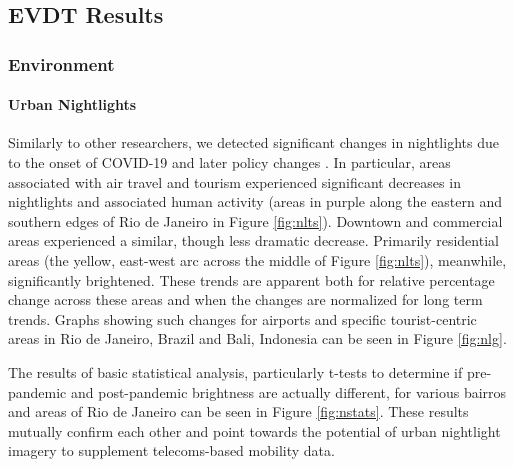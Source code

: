 \subsection{EVDT Results} \label{sec:vida-evdt-result}

\subsubsection{Environment} \label{sec:vida-evdt-e-result}

\paragraph{Urban Nightlights} \leavevmode\newline

Similarly to other researchers, we detected significant changes in nightlights due to the onset of COVID-19 and later policy changes \cite{elvidgeDimmingLightsChina2020, xbsdScipy2021Predicting2021}. In particular, areas associated with air travel and tourism experienced significant decreases in nightlights and associated human activity (areas in purple along the eastern and southern edges of Rio de Janeiro in Figure \ref{fig:nlts}). Downtown and commercial areas experienced a similar, though less dramatic decrease. Primarily residential areas (the yellow, east-west arc across the middle of Figure \ref{fig:nlts}), meanwhile, significantly brightened. These trends are apparent both for relative percentage change across these areas and when the changes are normalized for long term trends. Graphs showing such changes for airports and specific tourist-centric areas in Rio de Janeiro, Brazil and Bali, Indonesia can be seen in Figure \ref{fig:nlg}. 

The results of basic statistical analysis, particularly t-tests to determine if pre-pandemic and post-pandemic brightness are actually different, for various bairros and areas of Rio de Janeiro can be seen in Figure \ref{fig:nstats}. These results mutually confirm each other and point towards the potential of urban nightlight imagery to supplement telecoms-based mobility data.

